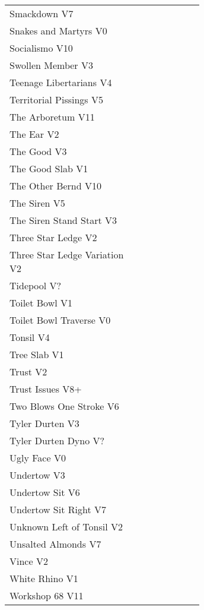 \begin{center}
\begin{supertabular}{p{0.65\linewidth}r}
Smackdown V7 & \pageref{rt:Smackdown} \\
Snakes and Martyrs V0 & \pageref{rt:Snakes and Martyrs} \\
Socialismo V10 & \pageref{rt:Socialismo} \\
Swollen Member V3 & \pageref{rt:Swollen Member} \\
Teenage Libertarians V4 & \pageref{rt:Teenage Libertarians} \\
Territorial Pissings V5 & \pageref{rt:Territorial Pissings} \\
The Arboretum V11 & \pageref{rt:The Arboretum} \\
The Ear V2 & \pageref{rt:The Ear} \\
The Good V3 & \pageref{rt:The Good} \\
The Good Slab V1 & \pageref{rt:The Good Slab} \\
The Other Bernd V10 & \pageref{rt:The Other Bernd} \\
The Siren V5 & \pageref{rt:The Siren} \\
The Siren Stand Start V3 & \pageref{vr:The Siren Stand Start} \\
Three Star Ledge V2 & \pageref{rt:Three Star Ledge} \\
Three Star Ledge Variation V2 & \pageref{vr:Three Star Ledge Variation} \\
Tidepool V? & \pageref{rt:Tidepool} \\
Toilet Bowl V1 & \pageref{rt:Toilet Bowl} \\
Toilet Bowl Traverse V0 & \pageref{rt:Toilet Bowl Traverse} \\
Tonsil V4 & \pageref{rt:Tonsil} \\
Tree Slab V1 & \pageref{rt:Tree Slab} \\
Trust V2 & \pageref{rt:Trust} \\
Trust Issues V8+ & \pageref{rt:Trust Issues} \\
Two Blows One Stroke V6 & \pageref{rt:Two Blows One Stroke} \\
Tyler Durten V3 & \pageref{rt:Tyler Durten} \\
Tyler Durten Dyno V? & \pageref{vr:Tyler Durten Dyno} \\
Ugly Face V0 & \pageref{rt:Ugly Face} \\
Undertow V3 & \pageref{rt:Undertow} \\
Undertow Sit V6 & \pageref{vr:Undertow Sit} \\
Undertow Sit Right V7 & \pageref{vr:Undertow Sit Right} \\
Unknown Left of Tonsil V2 & \pageref{rt:Unknown Left of Tonsil} \\
Unsalted Almonds V7 & \pageref{rt:Unsalted Almonds} \\
Vince V2 & \pageref{rt:Vince} \\
White Rhino V1 & \pageref{rt:White Rhino} \\
Workshop 68 V11 & \pageref{rt:Workshop 68} \\
\end{supertabular}
\end{center}
